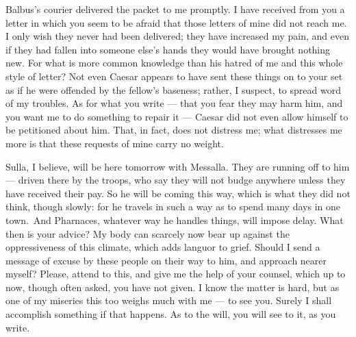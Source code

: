 

 Balbus's courier delivered the packet to me promptly. I have received from you a letter in which you seem to be afraid that those letters of mine did not reach me. I only wish they never had been delivered; they have increased my pain, and even if they had fallen into someone else's hands they would have brought nothing new. For what is more common knowledge than his hatred of me and this whole style of letter? Not even Caesar appears to have sent these things on to your set as if he were offended by the fellow's baseness; rather, I suspect, to spread word of my troubles. As for what you write --- that you fear they may harm him, and you want me to do something to repair it --- Caesar did not even allow himself to be petitioned about him. That, in fact, does not distress me; what distresses me more is that these requests of mine carry no weight.

 Sulla, I believe, will be here tomorrow with Messalla. They are running off to him --- driven there by the troops, who say they will not budge anywhere unless they have received their pay. So he will be coming this way, which is what they did not think, though slowly: for he travels in such a way as to spend many days in one \dag town.\dag\ And Pharnaces, whatever way he handles things, will impose delay. What then is your advice? My body can scarcely now bear up against the oppressiveness of this climate, which adds languor to grief. Should I send a message of excuse by these people on their way to him, and approach nearer myself? Please, attend to this, and give me the help of your counsel, which up to now, though often asked, you have not given. I know the matter is hard, but as one of my miseries this too weighs much with me --- to see you. Surely I shall accomplish something if that happens. As to the will, you will see to it, as you write.
